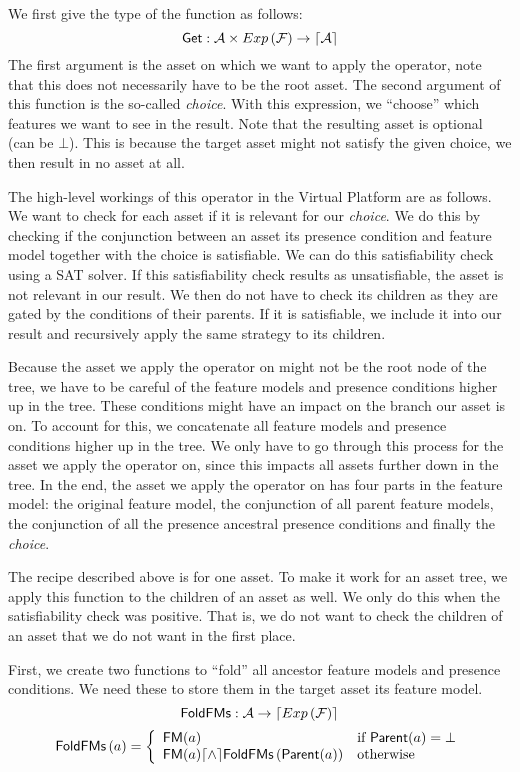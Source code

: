 We first give the type of the function as follows:
\[
  {\sf Get} : \mathcal{A} \times Exp \left( \mathcal{F} \right) \rightarrow \lceil \mathcal{A} \rceil
\]
The first argument is the asset on which we want to apply the operator, note
that this does not necessarily have to be the root asset. The second argument
of this function is the so-called \emph{choice}. With this expression, we
``choose'' which features we want to see in the result. Note that the resulting
asset is optional (can be \(\bot\)). This is because the target asset might not
satisfy the given choice, we then result in no asset at all.

The high-level workings of this operator in the Virtual Platform are as
follows. We want to check for each asset if it is relevant for our
\emph{choice}. We do this by checking if the conjunction between an asset its
presence condition and feature model together with the choice is satisfiable.
We can do this satisfiability check using a SAT solver. If this satisfiability
check results as unsatisfiable, the asset is not relevant in our result. We
then do not have to check its children as they are gated by the conditions of
their parents. If it is satisfiable, we include it into our result and 
recursively apply the same strategy to its children. 

Because the asset we apply the operator on might not be the root node of the
tree, we have to be careful of the feature models and presence conditions higher
up in the tree. These conditions might have an impact on the branch our asset is 
on. To account for this, we concatenate all feature models and presence
conditions higher up in the tree. We only have to go through this process for
the asset we apply the operator on, since this impacts all assets further down
in the tree. In the end, the asset we apply the operator on has four parts in
the feature model: the original feature model, the conjunction of all parent
feature models, the conjunction of all the presence ancestral presence
conditions and finally the \emph{choice}.

The recipe described above is for one asset. To make it work for an asset tree,
we apply this function to the children of an asset as well. We only do this
when the satisfiability check was positive. That is, we do not want to check
the children of an asset that we do not want in the first place.

First, we create two functions to ``fold'' all ancestor feature models and
presence conditions. We need these to store them in the target asset its
feature model.
\[
  {\sf FoldFMs} : \mathcal{A} \rightarrow \lceil Exp \left( \mathcal{F} \right) \rceil
\]
\[
  {\sf FoldFMs}\left(a\right) =
  \left\{
    \begin{array}{ll}
      {\sf FM}(a) & \text{if } {\sf Parent}(a) = \bot \\
      {\sf FM}(a) \lceil \land \rceil {\sf FoldFMs}\left( {\sf Parent}(a) \right) & \text{otherwise}
    \end{array}
  \right.
\]

